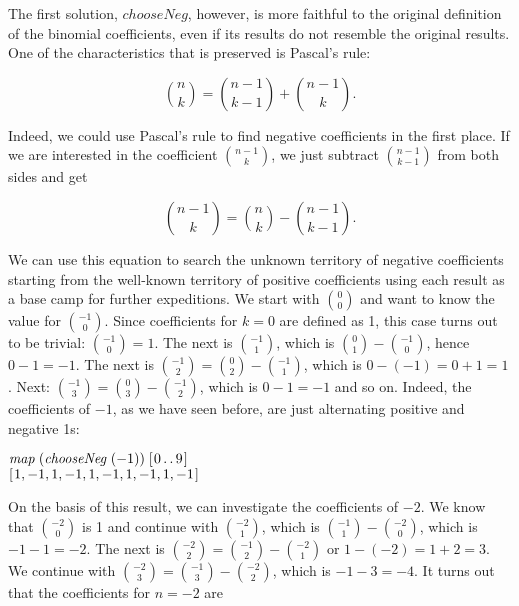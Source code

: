 \documentclass[tikz]{scrreprt}
\newcommand{\Varid}[1]{\mathit{#1}}
\begin{document}
The first solution, \ensuremath{\Varid{chooseNeg}}, however,
is more faithful to the original definition
of the binomial coefficients,
even if its results do not resemble the original results.
One of the characteristics that is preserved
is Pascal's rule:

\begin{equation}
  \binom{n}{k} = \binom{n-1}{k-1} + \binom{n-1}{k}.
\end{equation}

Indeed, we could use Pascal's rule
to find negative coefficients in the first place.
If we are interested in the coefficient
$\binom{n-1}{k}$, we just subtract
$\binom{n-1}{k-1}$ from both sides and get

\begin{equation}\label{eq:PascalNegativeN}
  \binom{n-1}{k} = \binom{n}{k} - \binom{n-1}{k-1}.
\end{equation}

We can use this equation to search the unknown
territory of negative coefficients starting
from the well-known territory of positive coefficients
using each result as a base camp for further
expeditions.
We start with $\binom{0}{0}$ and want to know
the value for $\binom{-1}{0}$.
Since coefficients for $k=0$ are defined as 1,
this case turns out to be trivial:
$\binom{-1}{0} = 1$.
The next is $\binom{-1}{1}$, which is
$\binom{0}{1} - \binom{-1}{0}$, hence
$0 - 1 = -1$. The next is 
$\binom{-1}{2} = \binom{0}{2} - \binom{-1}{1}$, which is
$0 - (-1) = 0 + 1 = 1$.
Next: $\binom{-1}{3} = \binom{0}{3} - \binom{-1}{2}$,
which is $0 - 1 = -1$ and so on.
Indeed, the coefficients of $-1$, as we have seen before,
are just alternating
positive and negative 1s:

\ensuremath{\Varid{map}\;(\Varid{chooseNeg}\;(\mathbin{-}\mathrm{1}))\;[\mskip1.5mu \mathrm{0}\mathinner{\ldotp\ldotp}\mathrm{9}\mskip1.5mu]}\\
\ensuremath{[\mskip1.5mu \mathrm{1},\mathbin{-}\mathrm{1},\mathrm{1},\mathbin{-}\mathrm{1},\mathrm{1},\mathbin{-}\mathrm{1},\mathrm{1},\mathbin{-}\mathrm{1},\mathrm{1},\mathbin{-}\mathrm{1}\mskip1.5mu]}

On the basis of this result,
we can investigate the coefficients of $-2$.
We know that $\binom{-2}{0}$ is 1 and continue with
$\binom{-2}{1}$, which is $\binom{-1}{1} - \binom{-2}{0}$,
which is $-1 - 1 = -2$.
The next is $\binom{-2}{2} = \binom{-1}{2} - \binom{-2}{1}$
or $1 - (-2) = 1 + 2 = 3$.
We continue with $\binom{-2}{3} = \binom{-1}{3} - \binom{-2}{2}$,
which is $-1 - 3 = -4$.
It turns out that the coefficients for $n=-2$ are
\end{document}
